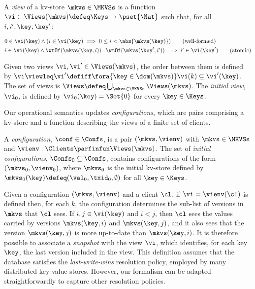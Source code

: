 \spaceshrink{-3pt}
\begin{definition}[Views]
\label{def:view}
\label{def:cuts}
\label{def:views}
A \emph{view} of a kv-store $\mkvs \in \MKVSs$ is a function
$\vi \in \Views(\mkvs) \defeq \Keys \to\pset{\Nat}$ such that, for all $i, i', \key, \key'$:

\spaceshrink{-12pt}
{%
\displaymathfont
\begin{align*}
    & 
    0 \in \vi(\key) 
    \land (i \in \vi(\key) \implies 0 \leq i < \abs{ \mkvs(\key) }) 
    \tag{well-formed}
    \label{eq:view.wf}\\
    & 
    \begin{array}{@{}l@{}}
	i \in \vi(\key)  
  	\land \wtOf(\mkvs(\key, i)) {=} \wtOf(\mkvs(\key', i'))  
  	\implies i' \in \vi(\key')
    \end{array}
	\tag{atomic}
	\label{eq:view.atomic}
\end{align*}
}%
\spaceshrink{-12pt}

Given two views $\vi, \vi' \in \Views(\mkvs)$, 
the order between them is defined by $\vi \viewleq \vi' \defiff \fora{\key \in \dom(\mkvs)} \vi(k) \subseteq \vi'(\key)$.
The set of views is $\Views \defeq \bigcup_{\mkvs \in \MKVSs} \Views(\mkvs)$.
The \emph{initial view}, $\vi_{0}$,  is defined by
$\vi_{0}(\key) = \Set{0}$ for every $\key \in \Keys$. 
\end{definition}
\spaceshrink{-3pt}

Our operational semantics updates {\em configurations},  which are pairs
comprising a kv-store and a function describing the
views of a finite set of clients. 

\spaceshrink{-3pt}
\begin{definition}[Configurations]
\label{def:configuration}
A \emph{configuration}, $\conf \in \Confs $,  is a pair $ (\mkvs, \vienv)$
with $\mkvs \in \MKVSs$ and
$\vienv : \Clients \parfinfun \Views(\mkvs)$. 
The set of \emph{initial configurations}, $\Confs_0 \subseteq \Confs$,
contains configurations of the form $ (\mkvs_0, \vienv_0)$, where
$\mkvs_0$ is the initial kv-store defined by
$\mkvs_{0}(\key)\defeq  (\val_0, \txid_0, \emptyset)$ for
all $\key \in \Keys$. 
\end{definition}
\spaceshrink{-3pt}


Given a configuration $(\mkvs, \vienv)$ and a client $\cl$, 
if $\vi = \vienv(\cl)$ is defined then, for each $k$,  the
configuration determines the sub-list of versions in $\mkvs$ that $\cl$ sees.
If $i,j \in \vi(\key)$ and $i < j$, then $\cl$ sees the values 
carried by versions $\mkvs(\key, i)$ and  $\mkvs(\key, j)$, 
and it also sees that the version $\mkvs(\key, j)$ is more up-to-date than $\mkvs(\key, i)$. 
It is therefore possible to associate a \emph{snapshot} with the view $\vi$, 
which identifies, for each key $\key$, the last version included in the view. 
This definition assumes that the database satisfies the \emph{last-write-wins}
resolution policy, employed by many distributed key-value stores.
However, our formalism can be adapted straightforwardly  to capture other resolution policies. 

